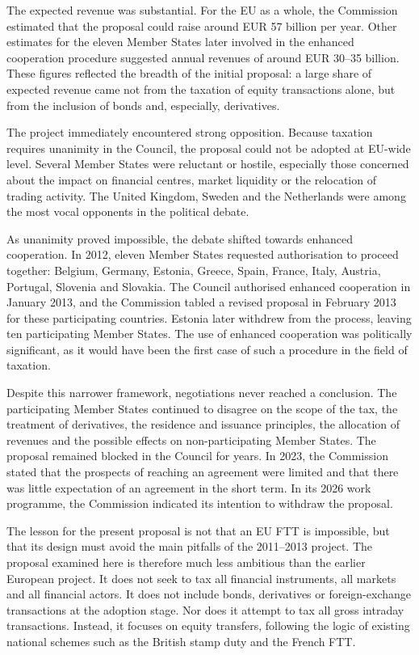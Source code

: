 \documentclass[../../main]{subfiles}
\begin{document}
The expected revenue was substantial. For the EU as a whole, the Commission estimated that the proposal could raise around EUR 57 billion per year. Other estimates for the eleven Member States later involved in the enhanced cooperation procedure suggested annual revenues of around EUR 30--35 billion. These figures reflected the breadth of the initial proposal: a large share of expected revenue came not from the taxation of equity transactions alone, but from the inclusion of bonds and, especially, derivatives.

The project immediately encountered strong opposition. Because taxation requires unanimity in the Council, the proposal could not be adopted at EU-wide level. Several Member States were reluctant or hostile, especially those concerned about the impact on financial centres, market liquidity or the relocation of trading activity. The United Kingdom, Sweden and the Netherlands were among the most vocal opponents in the political debate. 

As unanimity proved impossible, the debate shifted towards enhanced cooperation. In 2012, eleven Member States requested authorisation to proceed together: Belgium, Germany, Estonia, Greece, Spain, France, Italy, Austria, Portugal, Slovenia and Slovakia. The Council authorised enhanced cooperation in January 2013, and the Commission tabled a revised proposal in February 2013 for these participating countries. Estonia later withdrew from the process, leaving ten participating Member States. The use of enhanced cooperation was politically significant, as it would have been the first case of such a procedure in the field of taxation.

Despite this narrower framework, negotiations never reached a conclusion. The participating Member States continued to disagree on the scope of the tax, the treatment of derivatives, the residence and issuance principles, the allocation of revenues and the possible effects on non-participating Member States. The proposal remained blocked in the Council for years. In 2023, the Commission stated that the prospects of reaching an agreement were limited and that there was little expectation of an agreement in the short term. In its 2026 work programme, the Commission indicated its intention to withdraw the proposal.

The lesson for the present proposal is not that an EU FTT is impossible, but that its design must avoid the main pitfalls of the 2011--2013 project. The proposal examined here is therefore much less ambitious than the earlier European project. It does not seek to tax all financial instruments, all markets and all financial actors. It does not include bonds, derivatives or foreign-exchange transactions at the adoption stage. Nor does it attempt to tax all gross intraday transactions. Instead, it focuses on equity transfers, following the logic of existing national schemes such as the British stamp duty and the French FTT.
\end{document}
